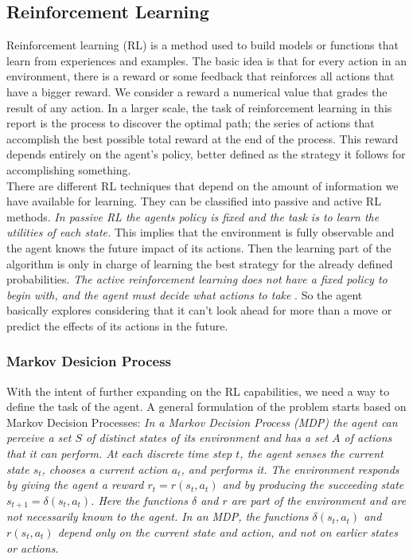 \subsection*{Reinforcement Learning}

Reinforcement learning (RL) is a method used to build models or functions that learn from experiences and examples. The basic idea is that for every action in an environment, there is a reward or some feedback that reinforces all actions that have a bigger reward. We consider a reward a numerical value that grades the result of any action. In a larger scale, the task of reinforcement learning in this report is the process to discover the optimal path; the series of actions that accomplish the best possible total reward at the end of the process. This reward depends entirely on the agent's policy, better defined as the strategy it follows for accomplishing something. \\


There are different RL techniques that depend on the amount of information we have available for learning. They can be classified into passive and active RL methods. \textit{In passive RL the agents policy is fixed and the task is to learn the utilities of each state.} \cite[p764]{rl} This implies that the environment is fully observable and the agent knows the future impact of its actions. Then the learning part of the algorithm is only in charge of learning the best strategy for the already defined probabilities. \textit{The active reinforcement learning does not have a fixed policy to begin with, and the agent must decide what actions to take} \cite[p771]{rl}. So the agent basically explores considering that it can't look ahead for more than a move or predict the effects of its actions in the future.\\


\subsubsection{Markov Desicion Process} \label{mdp}

With the intent of further expanding on the RL capabilities, we need a way to define the task of the agent. A general formulation of the problem starts based on Markov Decision Processes: \textit{In a Markov Decision Process (MDP) the agent can perceive a set $S$ of distinct states of its environment and has a set $A$ of actions that it can perform. At each discrete time step $t$, the agent senses the current state $s_t$, chooses a current action $a_t$, and performs it. The environment responds by giving the agent a reward $r_t = r(s_t,a_t)$ and by producing the succeeding state $s_{t+1}= \delta (s_t,a_t)$. Here the functions $\delta$ and $r$ are part of the environment and are not necessarily known to the agent. In an MDP, the functions $\delta (s_t,a_t)$ and $r(s_t,a_t)$ depend only on the current state and action, and not on earlier states or actions.}\cite[p370]{ml_tom_mitchel} \\


